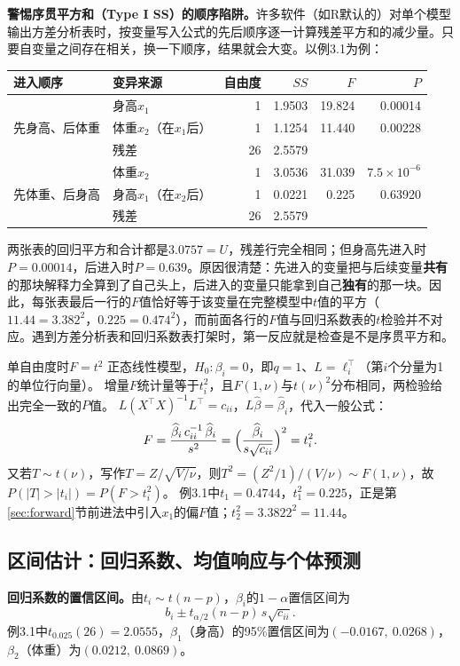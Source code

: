 \textbf{警惕序贯平方和（Type I SS）的顺序陷阱。}许多软件（如R默认的）对单个模型输出方差分析表时，按变量写入公式的先后顺序逐一计算残差平方和的减少量。只要自变量之间存在相关，换一下顺序，结果就会大变。以例3.1为例：
\begin{center}\small
\begin{tabular}{llrrrr}
\toprule 进入顺序&变异来源&自由度&$SS$&$F$&$P$\\\midrule
\multirow{3}{*}{先身高、后体重}&身高$x_1$&1&1.9503&19.824&0.00014\\
&体重$x_2$（在$x_1$后）&1&1.1254&11.440&0.00228\\
&残差&26&2.5579&&\\\midrule
\multirow{3}{*}{先体重、后身高}&体重$x_2$&1&3.0536&31.039&$7.5\times10^{-6}$\\
&身高$x_1$（在$x_2$后）&1&0.0221&0.225&0.63920\\
&残差&26&2.5579&&\\\bottomrule
\end{tabular}
\end{center}
两张表的回归平方和合计都是$3.0757=U$，残差行完全相同；但身高先进入时$P=0.00014$，后进入时$P=0.639$。原因很清楚：先进入的变量把与后续变量\textbf{共有}的那块解释力全算到了自己头上，后进入的变量只能拿到自己\textbf{独有}的那一块。因此，每张表最后一行的$F$值恰好等于该变量在完整模型中$t$值的平方（$11.44=3.382^2$，$0.225=0.474^2$），而前面各行的$F$值与回归系数表的$t$检验并不对应。遇到方差分析表和回归系数表打架时，第一反应就是检查是不是序贯平方和。

\begin{derivation}{单自由度时$F=t^2$}
正态线性模型，$H_0:\beta_i=0$，即$q=1$、$L=\ell_i^\top$（第$i$个分量为1的单位行向量）。
增量$F$统计量等于$t_i^2$，且$F(1,\nu)$与$t(\nu)^2$分布相同，两检验给出完全一致的$P$值。
$L(X^\top X)^{-1}L^\top=c_{ii}$，$L\widehat\beta=\widehat\beta_i$，代入一般公式：
\[
F=\frac{\widehat\beta_i\,c_{ii}^{-1}\,\widehat\beta_i}{s^2}=\Bigl(\frac{\widehat\beta_i}{s\sqrt{c_{ii}}}\Bigr)^2=t_i^2 .
\]
又若$T\sim t(\nu)$，写作$T=Z/\sqrt{V/\nu}$，则$T^2=(Z^2/1)/(V/\nu)\sim F(1,\nu)$，故$P(|T|>|t_i|)=P(F>t_i^2)$。
例3.1中$t_1=0.4744$，$t_1^2=0.225$，正是第\ref{sec:forward}节前进法中引入$x_1$的偏$F$值；$t_2^2=3.3822^2=11.44$。
\end{derivation}

\subsection{区间估计：回归系数、均值响应与个体预测}\label{sec:interval}
\textbf{回归系数的置信区间。}由$t_i\sim t(n-p)$，$\beta_i$的$1-\alpha$置信区间为
\[
b_i\pm t_{\alpha/2}(n-p)\,s\sqrt{c_{ii}} .
\]
例3.1中$t_{0.025}(26)=2.0555$，$\beta_1$（身高）的95\%置信区间为$(-0.0167,\ 0.0268)$，$\beta_2$（体重）为$(0.0212,\ 0.0869)$。

